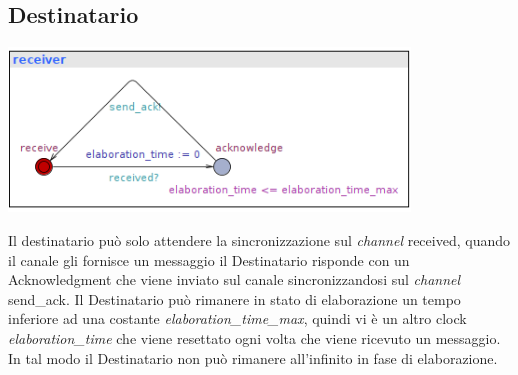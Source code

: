 \documentclass[a4paper]{article}
\newcommand{\channel}{\textit{channel }}
\begin{document}
\subsection{Destinatario}
\begin{center}\includegraphics[width=0.8\textwidth]{1_receiver.png}\end{center}
Il destinatario può solo attendere la sincronizzazione sul \channel received, quando il canale gli fornisce un messaggio il Destinatario risponde con un Acknowledgment che viene inviato sul canale sincronizzandosi sul \channel send\_ack.
Il Destinatario può rimanere in stato di elaborazione un tempo inferiore ad una costante \textit{elaboration\_time\_max}, quindi vi è un altro clock \textit{elaboration\_time} che viene resettato ogni volta che viene ricevuto un messaggio.
In tal modo il Destinatario non può rimanere all'infinito in fase di elaborazione.
\end{document}
